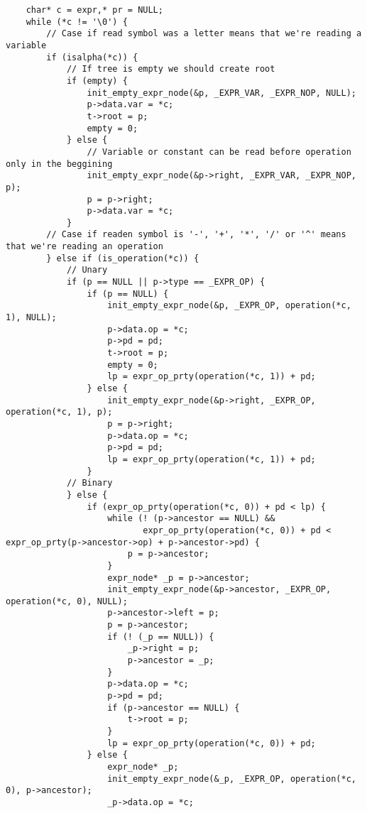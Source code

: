 \documentclass[a4paper]{article}
\newcounter{i}
\begin{document}
\begin{enumerate}[label=\textbf{\arabic*}.]
\begin{verbatim}
    char* c = expr,* pr = NULL;
    while (*c != '\0') {
        // Case if read symbol was a letter means that we're reading a variable
        if (isalpha(*c)) {
            // If tree is empty we should create root
            if (empty) {
                init_empty_expr_node(&p, _EXPR_VAR, _EXPR_NOP, NULL);
                p->data.var = *c;
                t->root = p;
                empty = 0;
            } else {
                // Variable or constant can be read before operation only in the beggining
                init_empty_expr_node(&p->right, _EXPR_VAR, _EXPR_NOP, p);
                p = p->right;
                p->data.var = *c;
            }
        // Case if readen symbol is '-', '+', '*', '/' or '^' means that we're reading an operation
        } else if (is_operation(*c)) {
            // Unary
            if (p == NULL || p->type == _EXPR_OP) {
                if (p == NULL) {
                    init_empty_expr_node(&p, _EXPR_OP, operation(*c, 1), NULL);
                    p->data.op = *c;
                    p->pd = pd;
                    t->root = p;
                    empty = 0;
                    lp = expr_op_prty(operation(*c, 1)) + pd;
                } else {
                    init_empty_expr_node(&p->right, _EXPR_OP, operation(*c, 1), p);
                    p = p->right;
                    p->data.op = *c;
                    p->pd = pd;
                    lp = expr_op_prty(operation(*c, 1)) + pd;
                }
            // Binary
            } else {
                if (expr_op_prty(operation(*c, 0)) + pd < lp) {
                    while (! (p->ancestor == NULL) && 
                           expr_op_prty(operation(*c, 0)) + pd < expr_op_prty(p->ancestor->op) + p->ancestor->pd) {
                        p = p->ancestor;
                    }
                    expr_node* _p = p->ancestor;
                    init_empty_expr_node(&p->ancestor, _EXPR_OP, operation(*c, 0), NULL);
                    p->ancestor->left = p;
                    p = p->ancestor;
                    if (! (_p == NULL)) {
                        _p->right = p;
                        p->ancestor = _p;
                    }
                    p->data.op = *c;
                    p->pd = pd;
                    if (p->ancestor == NULL) {
                        t->root = p;
                    }
                    lp = expr_op_prty(operation(*c, 0)) + pd;
                } else {
                    expr_node* _p;
                    init_empty_expr_node(&_p, _EXPR_OP, operation(*c, 0), p->ancestor);
                    _p->data.op = *c;

\end{verbatim}
\end{enumerate}
\end{document}
